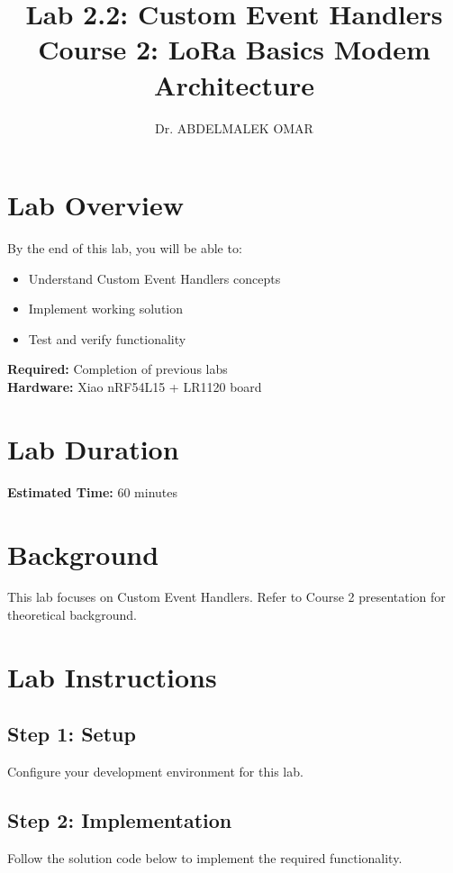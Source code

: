 \documentclass[11pt,a4paper]{article}
\title{\textbf{Lab 2.2: Custom Event Handlers}\\
\large Course 2: LoRa Basics Modem Architecture}
\author{Dr. ABDELMALEK OMAR}
\date{}
\begin{document}
\maketitle
\thispagestyle{fancy}

\section{Lab Overview}

\begin{objectivebox}
By the end of this lab, you will be able to:
\begin{itemize}
    \item Understand Custom Event Handlers concepts
    \item Implement working solution
    \item Test and verify functionality
\end{itemize}
\end{objectivebox}

\begin{prereqbox}
\textbf{Required:} Completion of previous labs\\
\textbf{Hardware:} Xiao nRF54L15 + LR1120 board
\end{prereqbox}

\section{Lab Duration}
\textbf{Estimated Time:} 60 minutes

\section{Background}

This lab focuses on Custom Event Handlers. Refer to Course 2 presentation for theoretical background.

\section{Lab Instructions}

\subsection{Step 1: Setup}
Configure your development environment for this lab.

\subsection{Step 2: Implementation}
Follow the solution code below to implement the required functionality.
\end{document}
